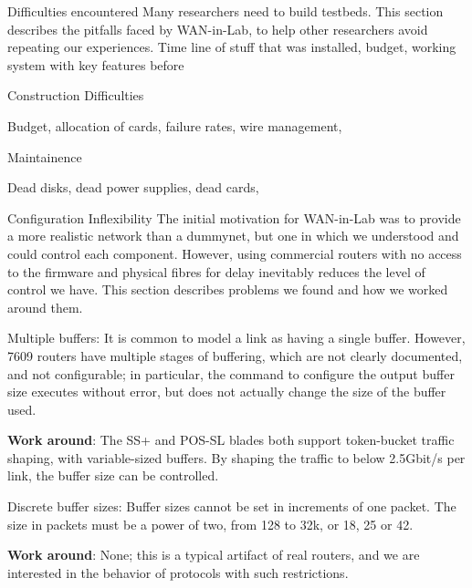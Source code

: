 \documentclass{IEEEtran}
\begin{document}
\begin{section}{Difficulties encountered}
Many researchers need to build testbeds.  This section describes the
pitfalls faced by WAN-in-Lab, to help other researchers avoid repeating
our experiences. Time line of stuff that was installed, budget, working
system with key features before

\begin{subsection}{Construction Difficulties}

Budget, allocation of cards, failure rates, wire management,

Maintainence

Dead disks, dead power supplies, dead cards,
\end{subsection}

\begin{subsection}{Configuration Inflexibility}
The initial motivation for WAN-in-Lab was to provide a more realistic
network than a dummynet, but one in which we understood and could control
each component.  However, using commercial routers with no access to the
firmware and physical fibres for delay inevitably reduces the level of
control we have.  This section describes problems we found and how we
worked around them.

\begin{subsubsection}{Multiple buffers}: It is common to model a link as having a single buffer.
However, 7609 routers have multiple stages of buffering, which are not
clearly documented, and not configurable; in particular, the command
to configure the output buffer size executes without error, but does
not actually change the size of the buffer used.

{\bf Work around}: The
SS+ and POS-SL blades both support token-bucket traffic shaping, with
variable-sized buffers.  By shaping the traffic to below 2.5Gbit/s per
link, the buffer size can be controlled.
\end{subsubsection}

\begin{subsubsection}{Discrete buffer sizes}:
Buffer sizes cannot be set in increments of
one packet.  The size in packets must be a power of two, from 128 to
32k, or 18, 25 or 42.

{\bf Work around}: None; this is a typical artifact of
real routers, and we are interested in the behavior of protocols with
such restrictions.
\end{subsubsection}


\end{subsection}
\end{section}
\end{document}
